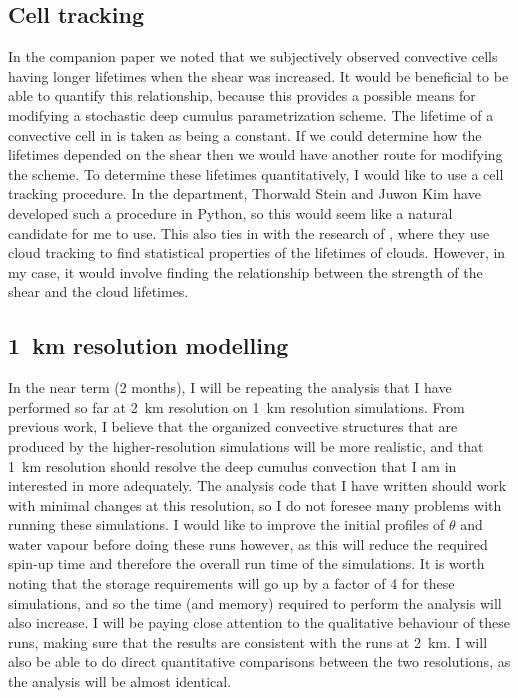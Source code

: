 \documentclass[11pt,a4paper]{article}
\begin{document}
\subsection{Cell tracking}
\label{sec:cell_tracking}

In the companion paper we noted that we subjectively observed convective cells having longer lifetimes when the shear was increased. It would be beneficial to be able to quantify this relationship, because this provides a possible means for modifying a stochastic deep cumulus parametrization scheme. The lifetime of a convective cell in \cite{plant2008stochastic} is taken as being a constant. If we could determine how the lifetimes depended on the shear then we would have another route for modifying the scheme. To determine these lifetimes quantitatively, I would like to use a cell tracking procedure. In the department, Thorwald Stein and Juwon Kim have developed such a procedure in Python, so this would seem like a natural candidate for me to use. This also ties in with the research of \cite{plant2009statistical}, where they use cloud tracking to find statistical properties of the lifetimes of clouds. However, in my case, it would involve finding the relationship between the strength of the shear and the cloud lifetimes.

\subsection{\SI{1}{km} resolution modelling}
\label{sec:1km_res}

In the near term (2 months), I will be repeating the analysis that I have performed so far at \SI{2}{km} resolution on \SI{1}{km} resolution simulations. From previous work, I believe that the organized convective structures that are produced by the higher-resolution simulations will be more realistic, and that \SI{1}{km} resolution should resolve the deep cumulus convection that I am in interested in more adequately. The analysis code that I have written should work with minimal changes at this resolution, so I do not foresee many problems with running these simulations. I would like to improve the initial profiles of $\theta$ and water vapour before doing these runs however, as this will reduce the required spin-up time and therefore the overall run time of the simulations. It is worth noting that the storage requirements will go up by a factor of 4 for these simulations, and so the time (and memory) required to perform the analysis will also increase. I will be paying close attention to the qualitative behaviour of these runs, making sure that the results are consistent with the runs at \SI{2}{km}. I will also be able to do direct quantitative comparisons between the two resolutions, as the analysis will be almost identical.
\end{document}
